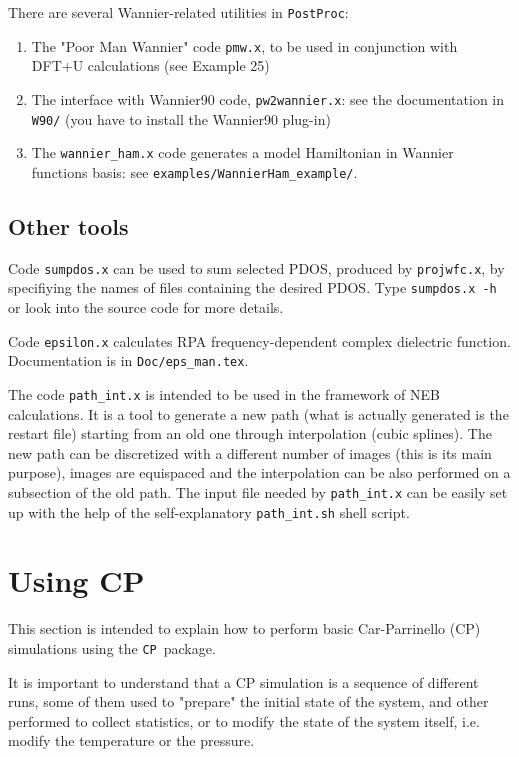 \documentclass[12pt,a4paper]{article}
\def\CP{\texttt{CP}}
\def\PostProc{\texttt{PostProc}}
\begin{document}
There are several Wannier-related utilities in \PostProc:
\begin{enumerate}
\item The "Poor Man Wannier" code \texttt{pmw.x}, to be used
in conjunction with DFT+U calculations (see Example 25)
\item The interface with Wannier90 code, \texttt{pw2wannier.x}:
see the documentation in \texttt{W90/} (you have to install the 
Wannier90 plug-in)
\item The \texttt{wannier\_ham.x} code generates a model Hamiltonian 
in Wannier functions basis: see \texttt{examples/WannierHam\_example/}.
\end{enumerate}

\subsection{Other tools}

Code \texttt{sumpdos.x} can be used to sum selected PDOS, produced by
\texttt{projwfc.x}, by specifiying the names of files
containing the desired PDOS. Type \texttt{sumpdos.x -h} or look into the source
code for more details. 

Code \texttt{epsilon.x} calculates RPA frequency-dependent complex dielectric function. Documentation is in \texttt{Doc/eps\_man.tex}.

The code \texttt{path\_int.x} is intended to be used in the framework of NEB
calculations. It is a tool to generate a new path (what is actually
generated is the restart file) starting from an old one through
interpolation (cubic splines). The new path can be discretized with a
different number of images (this is its main purpose), images are
equispaced and the interpolation can be also 
performed on a subsection of the old path. The input file needed by
\texttt{path\_int.x} can be easily set up  with the help of the self-explanatory
\texttt{path\_int.sh} shell script. 

\section{Using CP}

This section is intended to explain how to perform basic Car-Parrinello (CP)
simulations using the \CP\ package.
    
It is important to understand that a CP simulation is a sequence of different 
runs, some of them used to "prepare" the initial state of the system, and 
other performed to collect statistics, or to modify the state of the system
itself, i.e. modify the temperature or the pressure.
    
\end{document}
